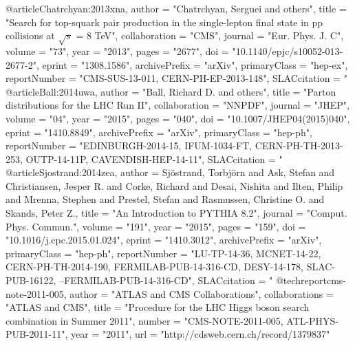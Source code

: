 @article{Chatrchyan:2013xna,
      author         = "Chatrchyan, Serguei and others",
      title          = "{Search for top-squark pair production in the
                        single-lepton final state in pp collisions at $\sqrt{s}$ =
                        8 TeV}",
      collaboration  = "CMS",
      journal        = "Eur.  Phys.  J. C",
      volume         = "73",
      year           = "2013",
      pages          = "2677",
      doi            = "10.1140/epjc/s10052-013-2677-2",
      eprint         = "1308.1586",
      archivePrefix  = "arXiv",
      primaryClass   = "hep-ex",
      reportNumber   = "CMS-SUS-13-011, CERN-PH-EP-2013-148",
      SLACcitation   = "%
}
@article{Ball:2014uwa,
      author         = "Ball, Richard D. and others",
      title          = "{Parton distributions for the LHC Run II}",
      collaboration  = "NNPDF",
      journal        = "JHEP",
      volume         = "04",
      year           = "2015",
      pages          = "040",
      doi            = "10.1007/JHEP04(2015)040",
      eprint         = "1410.8849",
      archivePrefix  = "arXiv",
      primaryClass   = "hep-ph",
      reportNumber   = "EDINBURGH-2014-15, IFUM-1034-FT, CERN-PH-TH-2013-253,
                        OUTP-14-11P, CAVENDISH-HEP-14-11",
      SLACcitation   = "%
}
@article{Sjostrand:2014zea,
      author         = {Sj{\"o}strand, Torbj{\"o}rn and Ask, Stefan and Christiansen,
                        Jesper R. and Corke, Richard and Desai, Nishita and Ilten,
                        Philip and Mrenna, Stephen and Prestel, Stefan and
                        Rasmussen, Christine O. and Skands, Peter Z.},
      title          = "{An Introduction to PYTHIA 8.2}",
      journal        = "Comput. Phys. Commun.",
      volume         = "191",
      year           = "2015",
      pages          = "159",
      doi            = "10.1016/j.cpc.2015.01.024",
      eprint         = "1410.3012",
      archivePrefix  = "arXiv",
      primaryClass   = "hep-ph",
      reportNumber   = "LU-TP-14-36, MCNET-14-22, CERN-PH-TH-2014-190,
                        FERMILAB-PUB-14-316-CD, DESY-14-178, SLAC-PUB-16122,
                        --FERMILAB-PUB-14-316-CD",
      SLACcitation   = "%
}
@techreport{cms-note-2011-005,
      author = "{ATLAS and CMS Collaborations}",
      collaborations = "ATLAS and CMS",
      title        = "{Procedure for the LHC Higgs boson search combination
                       in Summer 2011}",
      number       = "CMS-NOTE-2011-005, ATL-PHYS-PUB-2011-11",
      year         = "2011",
      url          = "http://cdsweb.cern.ch/record/1379837"
}
